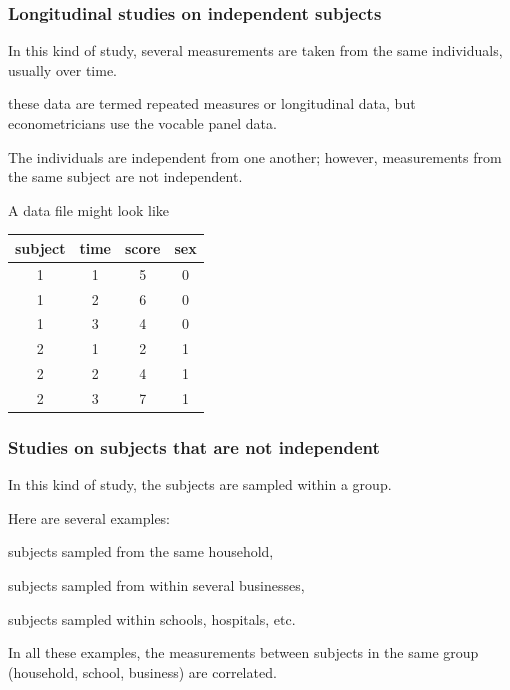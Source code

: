 \documentclass{beamer}
\begin{document}
\begin{frame}[fragile]
\frametitle{Longitudinal studies on independent subjects}
\bi
\item In this kind of study, several measurements are taken from the same individuals, usually over time. 
\bi

\item these data are termed \alert{repeated measures} or \alert{longitudinal data}, but econometricians use the vocable \alert{panel data}. 
\ei
\item The individuals are \alert{independent} from one another; however, measurements from the same subject are not independent.
\item A data file might look like 
{\footnotesize 
\begin{table}
\centering

\begin{tabular}{cccc}
 \toprule 
 \textbf{subject} & \textbf{time} & \textbf{score} & \textbf{sex}\\
 \midrule 
 1 & 1 & 5 & 0 \\
 1 & 2 & 6 & 0 \\
 1 & 3 & 4 & 0 \\
 2 & 1 & 2 & 1 \\
 2 & 2 & 4 & 1 \\
 2 & 3 & 7 & 1 \\
 \bottomrule
\end{tabular}
\end{table}
}


\ei
\end{frame}

\begin{frame}
\frametitle{Studies on subjects that are not independent}
\bi
\item In this kind of study, the subjects are sampled within a \alert{group}.
\item Here are several examples:
\bi

\item subjects sampled from the same household,
\item subjects sampled from within several businesses,
\item subjects sampled within schools, hospitals, etc. 
\ei
\item In all these examples, the measurements between subjects in the same group (household, school, business) are correlated.
\ei
\end{frame}
\end{document}

